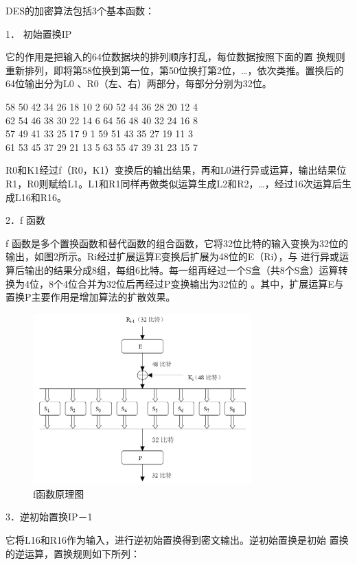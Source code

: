 \documentclass[UTF8,a4paper]{article}
\begin{document}
DES的加密算法包括3个基本函数：\par 
1．	初始置换IP\par 
它的作用是把输入的64位数据块的排列顺序打乱，每位数据按照下面的置
换规则重新排列，即将第58位换到第一位，第50位换打第2位，…，依次类推。置换后的64位输出分为L0 、R0（左、右）两部分，每部分分别为32位。\par 
\begin{center}
	 58 50 42 34 26 18 10 2 60 52 44 36 28 20 12 4\\
	62 54 46 38 30 22 14 6 64 56 48 40 32 24 16 8\\
	57 49 41 33 25 17 9  1 59 51 43 35 27 19 11 3\\
	61 53 45 37 29 21 13 5 63 55 47 39 31 23 15 7\par
	\end{center}
    R0和K1经过f（R0，K1）变换后的输出结果，再和L0进行异或运算，输出结果位R1，R0则赋给L1。L1和R1同样再做类似运算生成L2和R2，…，经过16次运算后生成L16和R16。\par 	
 2．f 函数\par 
f 函数是多个置换函数和替代函数的组合函数，它将32位比特的输入变换为32位的输出，如图2所示。Ri经过扩展运算E变换后扩展为48位的E（Ri），与 进行异或运算后输出的结果分成8组，每组6比特。每一组再经过一个S盒（共8个S盒）运算转换为4位，8个4位合并为32位后再经过P变换输出为32位的 。其中，扩展运算E与置换P主要作用是增加算法的扩散效果。\par 
		\begin{figure}[!ht]
	
	\centering
	\includegraphics[width=0.75\textwidth]{1-2.PNG}
	\caption{f函数原理图}
	\label{fig:1-2}
\end{figure}
3．逆初始置换IP－1
\par 它将L16和R16作为输入，进行逆初始置换得到密文输出。逆初始置换是初始
置换的逆运算，置换规则如下所列：\par 
\end{document}
